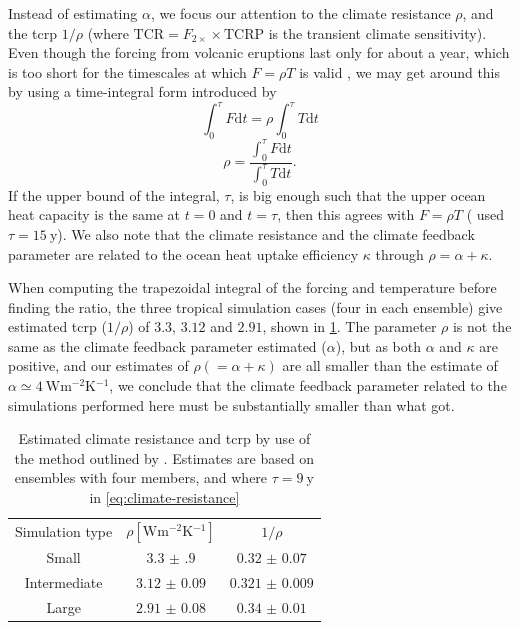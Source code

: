 \documentclass{ametsocV5}
\begin{document}
Instead of estimating \(\alpha \), we focus our attention to the climate resistance
\(\rho \), and the \ac{tcrp} \(1/\rho\) (where \(\mathrm{TCR}=F_{2\times}\times
\mathrm{TCRP}\) is the transient climate sensitivity). Even though the forcing from
volcanic eruptions last only for about a year, which is too short for the timescales at
which \(F=\rho T\) is valid \citep{gregory2016}, we may get around this by using a
time-integral form introduced by \citet{merlis2014}
\begin{equation}
  \int_0^{\tau}F \mathrm{d}t=\rho\int_{0}^{\tau}T \mathrm{d}t
\end{equation}
\begin{equation}
  \rho=\frac{\int_0^{\tau}F \mathrm{d}t}{\int_{0}^{\tau}T \mathrm{d}t}.
  \label{eq:climate-resistance}
\end{equation}
%
If the upper bound of the integral, \(\tau \), is big enough such that the upper ocean
heat capacity is the same at \(t=0\) and \(t=\tau \), then this agrees with \(F=\rho T\)
\citep{gregory2016} (\citet{merlis2014} used \(\tau =\SI{15}{\mathrm{y}}\)). We also
note that the climate resistance and the climate feedback parameter are related to the
ocean heat uptake efficiency \(\kappa \) through \(\rho =\alpha +\kappa \).

When computing the trapezoidal integral of the forcing and temperature before finding
the ratio, the three tropical simulation cases (four in each ensemble) give estimated
\ac{tcrp} (\(1/\rho\)) of \(3.3\), \(3.12\) and \(2.91\), shown in \cref{tab:trcp}. The
parameter \(\rho\) is not the same as the climate feedback parameter \citet{jones2005}
estimated (\(\alpha\)), but as both \(\alpha \) and \(\kappa \) are positive, and our
estimates of \(\rho (=\alpha +\kappa) \) are all smaller than the \citet{jones2005}
estimate of \(\alpha \simeq \SI{4}{\watt\metre^{-2}\kelvin^{-1}}\), we conclude that the
climate feedback parameter related to the simulations performed here must be
substantially smaller than what \citet{jones2005} got.

\begin{table}
  \centering

  \caption{Estimated climate resistance and \ac{tcrp} by use of the method outlined by
    \citet{merlis2014}. Estimates are based on ensembles with four members, and where \(\tau
    =\SI{9}{\mathrm{y}}\) in \cref{eq:climate-resistance}}\label{tab:trcp}%
  \begin{tabular}{ccc}
    Simulation type & \(\rho [\si{\watt\metre^{-2}\kelvin^{-1}}]\) & \(1/\rho\)         \\
    Small           & \(\num{3.3(9)}\)                             & \(\num{0.32(7)}\)  \\
    Intermediate    & \(\num{3.12(9)}\)                            & \(\num{0.321(9)}\) \\
    Large           & \(\num{2.91(8)}\)                            & \(\num{0.34(1)}\)  \\
  \end{tabular}
\end{table}
\end{document}
